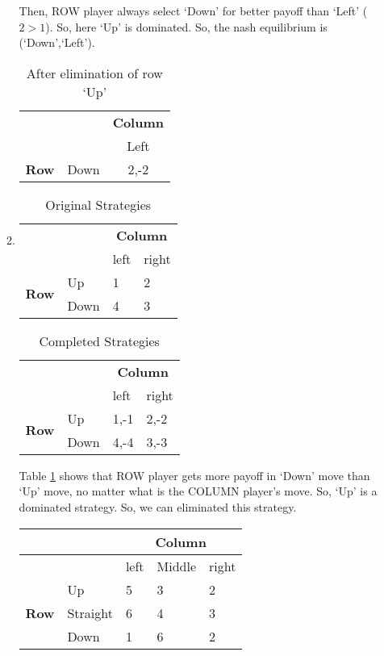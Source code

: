 \documentclass[a4paper,12pt]{article}
\begin{document}
\begin{enumerate}
\begin{enumerate}
Then, ROW player always select `Down' for better payoff than `Left' ($2>1$). So, here `Up' is dominated. So, the nash equilibrium is (`Down',`Left').

\begin{table}[H]
\centering
\begin{tabular}{@{}ccc@{}}
\toprule
& & \multicolumn{1}{c}{\bfseries Column}\\
& & Left\\
\multirow{2}{*}{\bfseries Row} & Down & 2,-2\\
\bottomrule
\end{tabular}
\caption{After elimination of row `Up'}
\end{table}


\item
\begin{table}[H]
\centering
\begin{tabular}{@{}llll@{}}
\toprule
& & \multicolumn{2}{c}{\bfseries Column}\\
& & left & right\\
\multirow{2}{*}{\bfseries Row} & Up & 1 & 2\\
 & Down & 4 & 3\\
\bottomrule
\end{tabular}
\caption{Original Strategies}
\end{table}


\begin{table}[H]
\centering
\begin{tabular}{@{}llll@{}}
\toprule
& & \multicolumn{2}{c}{\bfseries Column}\\
& & left & right\\
\multirow{2}{*}{\bfseries Row} & Up & 1,-1 & 2,-2\\
 & Down & 4,-4 & 3,-3\\
\bottomrule
\end{tabular}
\caption{Completed Strategies}
\label{tab:completeb}
\end{table}

Table \ref{tab:completeb} shows that ROW player gets more payoff in `Down' move than `Up' move, no matter what is the COLUMN player's move. So, `Up' is a dominated strategy. So, we can eliminated this strategy.


\begin{tabular}{@{}l|l|lll@{}}
& & \multicolumn{3}{c}{\bfseries Column}\\
\toprule
& & left & Middle & right\\
\hline
\multirow{3}{*}{\bfseries Row} & Up & 5 & 3 & 2\\
 & Straight & 6 & 4 & 3\\
 & Down & 1 & 6 & 2\\
\bottomrule
\end{tabular}


\end{enumerate}
\end{enumerate}
\end{document}
